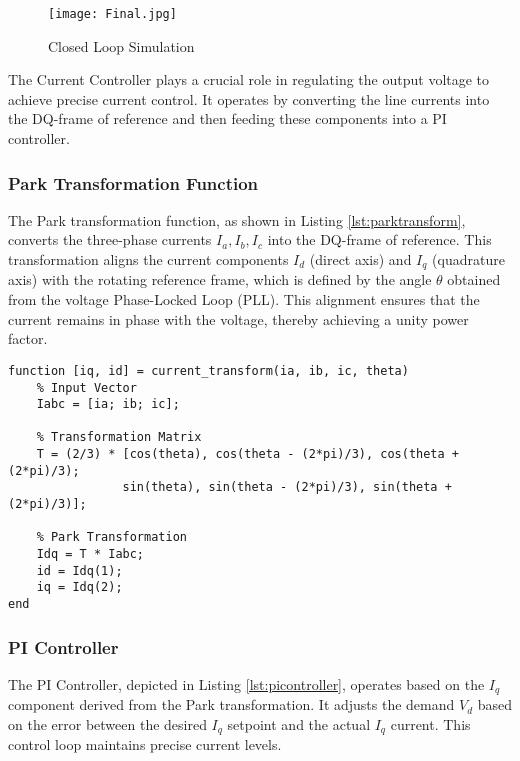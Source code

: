 \begin{figure}[h]
    \centering
    \texttt{[image: Final.jpg]}
    \caption{Closed Loop Simulation}
    \label{fig:final}
\end{figure}

The Current Controller plays a crucial role in regulating the output voltage to
achieve precise current control. It operates by converting the line currents
into the DQ-frame of reference and then feeding these components into a PI
controller.

\subsubsection{Park Transformation Function}

The Park transformation function, as shown in Listing \ref{lst:parktransform},
converts the three-phase currents \( I_a, I_b, I_c \) into the DQ-frame of
reference. This transformation aligns the current components \( I_d \) (direct
axis) and \( I_q \) (quadrature axis) with the rotating reference frame, which
is defined by the angle \( \theta \) obtained from the voltage Phase-Locked
Loop (PLL). This alignment ensures that the current remains in phase with the
voltage, thereby achieving a unity power factor.

\begin{lstlisting}[style=MATLAB, caption={Park Transformation}, label={lst:parktransform}]
function [iq, id] = current_transform(ia, ib, ic, theta)
    % Input Vector
    Iabc = [ia; ib; ic];

    % Transformation Matrix
    T = (2/3) * [cos(theta), cos(theta - (2*pi)/3), cos(theta + (2*pi)/3);
                sin(theta), sin(theta - (2*pi)/3), sin(theta + (2*pi)/3)];

    % Park Transformation
    Idq = T * Iabc;
    id = Idq(1);
    iq = Idq(2);
end
\end{lstlisting}

\subsubsection{PI Controller}

The PI Controller, depicted in Listing \ref{lst:picontroller}, operates based
on the \( I_q \) component derived from the Park transformation. It adjusts the
demand \( V_d \) based on the error between the desired \( I_q \) setpoint and
the actual \( I_q \) current. This control loop maintains precise current
levels.\\

